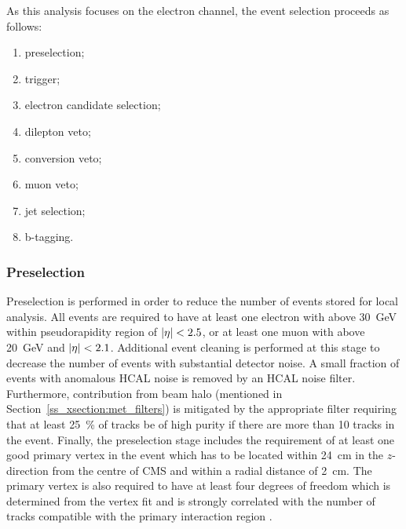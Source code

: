 
As this analysis focuses on the electron channel, the event selection proceeds as follows:

\begin{enumerate}[topsep=\parskip, parsep=\parskip, itemsep=\parskip, leftmargin=\leftmargin]
	\item preselection;
	\item trigger;
	\item electron candidate selection;
	\item dilepton veto;
	\item conversion veto;
	\item muon veto;
	\item jet selection;
	\item b-tagging.
\end{enumerate}

\subsubsection*{Preselection}
Preselection is performed in order to reduce the number of events stored for local analysis. All events are required to
have at least one electron with \ET above \SI{30}{\GeV} within pseudorapidity region of $\lvert \eta \rvert < 2.5$, or at least
one muon with \pt above \SI{20}{\GeV} and $\lvert \eta \rvert < 2.1$. Additional event cleaning is performed at this stage to
decrease the number of events with substantial detector noise. A small fraction of events with anomalous HCAL noise is
removed by an HCAL noise filter. Furthermore, contribution from beam halo (mentioned in
Section~\ref{ss_xsection:met_filters}) is mitigated by the appropriate filter requiring that at least \SI{25}{\percent}
of tracks be of high purity if there are more than \num{10} tracks in the event. Finally, the preselection stage
includes the requirement of at least one good primary vertex in the event which has to be located within
\SI{24}{\cm} in the $z$-direction from the centre of CMS and within a radial distance of \SI{2}{\cm}. The primary vertex
is also required to have at least four degrees of freedom which is determined from the vertex fit and is strongly
correlated with the number of tracks compatible with the primary interaction region \autocite{Tacking_PV_results_7TeV}.


